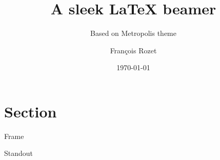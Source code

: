 \documentclass[12pt]{beamer}
\title{A sleek \LaTeX{} beamer}
\subtitle{Based on Metropolis theme}
\author{François Rozet}
\institute{University of Liège}
\date{\today}
\begin{document}
\maketitle

\section{Section}

\begin{frame}
\end{frame}

\begin{frame}{Frame}
\end{frame}

\begin{frame}[standout]
  Standout
\end{frame}

\begin{frame}[allowframebreaks]
    \nocite{einstein}
    \nocite{knuthwebsite}
    \nocite{dirac}
    \printbibliography
\end{frame}
\end{document}
